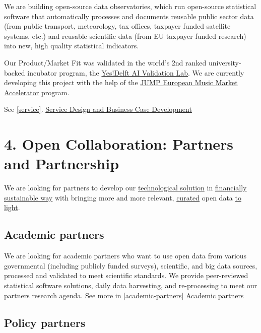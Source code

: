 \documentclass[
  a4paper,
  openany, a4paper, oneside]{book}
\begin{document}
We are building open-source data observatories, which run open-source statistical software that automatically processes and documents reusable public sector data (from public transport, meteorology, tax offices, taxpayer funded satellite systems, etc.) and reusable scientific data (from EU taxpayer funded research) into new, high quality statistical indicators.

Our Product/Market Fit was validated in the world's 2nd ranked university-backed incubator program, the \href{https://music.dataobservatory.eu/post/2020-09-25-yesdelft-validation/}{Yes!Delft AI Validation Lab}. We are currently developing this project with the help of the \href{https://www.jumpmusic.eu/fellow2021/automated-music-observatory/}{JUMP European Music Market Accelerator} program.

See \ref{service}. \protect\hyperlink{service}{Service Design and Business Case Development}

\hypertarget{open-for-partners}{%
\section*{4. Open Collaboration: Partners and Partnership}\label{open-for-partners}}

We are looking for partners to develop our \protect\hyperlink{app}{technological solution} in \href{service}{financially sustainable way} with bringing more and more relevant, \protect\hyperlink{data-curators}{curated} open data \protect\hyperlink{open-data}{to light}.

\hypertarget{intro-academic-partners}{%
\subsection*{Academic partners}\label{intro-academic-partners}}

We are looking for academic partners who want to use open data from various governmental (including publicly funded surveys), scientific, and big data sources, processed and validated to meet scientific standards. We provide peer-reviewed statistical software solutions, daily data harvesting, and re-processing to meet our partners research agenda. See more in \ref{academic-partners} \protect\hyperlink{academic-partners}{Academic partners}

\hypertarget{intro-policy-partners}{%
\subsection*{Policy partners}\label{intro-policy-partners}}
\end{document}
